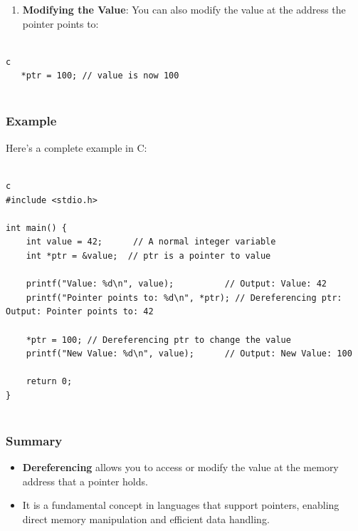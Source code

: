 \begin{botresponse}
\begin{lstlisting}[breaklines=true, breakatwhitespace=false]
\end{lstlisting}

\begin{enumerate}
\item \textbf{Modifying the Value}: You can also modify the value at the address the pointer points to:
\end{enumerate}

\begin{lstlisting}[breaklines=true, breakatwhitespace=false]

c
   *ptr = 100; // value is now 100
   

\end{lstlisting}

\subsubsection{Example}

Here’s a complete example in C:

\begin{lstlisting}[breaklines=true, breakatwhitespace=false]

c
#include <stdio.h>

int main() {
    int value = 42;      // A normal integer variable
    int *ptr = &value;  // ptr is a pointer to value

    printf("Value: %d\n", value);          // Output: Value: 42
    printf("Pointer points to: %d\n", *ptr); // Dereferencing ptr: Output: Pointer points to: 42

    *ptr = 100; // Dereferencing ptr to change the value
    printf("New Value: %d\n", value);      // Output: New Value: 100

    return 0;
}


\end{lstlisting}

\subsubsection{Summary}

\begin{itemize}
\item \textbf{Dereferencing} allows you to access or modify the value at the memory address that a pointer holds.
\item It is a fundamental concept in languages that support pointers, enabling direct memory manipulation and efficient data handling.
\end{itemize}

\end{botresponse}

